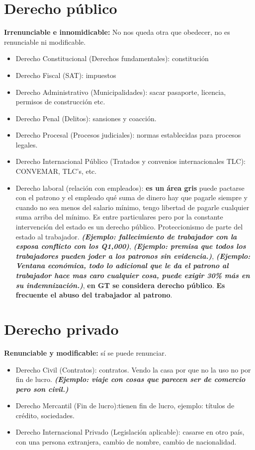 \section{Derecho público}
\textbf{Irrenunciable e innomidicable:} No nos queda otra que obedecer, no es renunciable ni modificable.
\begin{itemize}
    \item Derecho Constitucional (Derechos fundamentales): constitución 
    \item Derecho Fiscal (SAT): impuestos
    \item Derecho Administrativo (Municipalidades): sacar pasaporte, licencia, permisos de construcción etc.
    \item Derecho Penal (Delitos): sansiones y coacción.
    \item Derecho Procesal (Procesos judiciales): normas establecidas para procesos legales.
    \item Derecho Internacional Público (Tratados y convenios internacionales TLC): CONVEMAR, TLC's, etc.
    \item Derecho laboral (relación con empleados): \textbf{es un área gris} puede pactarse con el patrono y el empleado qué suma de dinero hay que pagarle siempre y cuando no sea menos del salario mínimo, tengo libertad de pagarle cualquier suma arriba del mínimo. Es entre particulares pero por la constante intervención del estado es un derecho público. Proteccionismo de parte del estado al trabajador. \newline \textbf{\emph{(Ejemplo: fallecimiento de trabajador con la esposa conflicto con los Q1,000)}}, \textbf{\emph{(Ejemplo: premisa que todos los trabajadores pueden joder a los patronos sin evidencia.)}}, \textbf{\emph{(Ejemplo: Ventana económica, todo lo adicional que le da el patrono al trabajador hace mas caro cualquier cosa, puede exigir 30\% más en su indemnización.)}}, \textbf{en GT se considera derecho público}. \textbf{Es frecuente el abuso del trabajador al patrono}.
\end{itemize}

\section{Derecho privado}
\textbf{Renunciable y modificable:} sí se puede renunciar.
\begin{itemize}
    \item Derecho Civil (Contratos): contratos. Vendo la casa por que no la uso no por fin de lucro. \textbf{\emph{(Ejemplo: viaje con cosas que parecen ser de comercio pero son civil.)}}
    \item Derecho Mercantil (Fin de lucro):tienen fin de lucro, ejemplo: títulos de crédito, sociedades. 
    \item Derecho Internacional Privado (Legislación aplicable): casarse en otro país, con una persona extranjera, cambio de nombre, cambio de nacionalidad.
\end{itemize}

